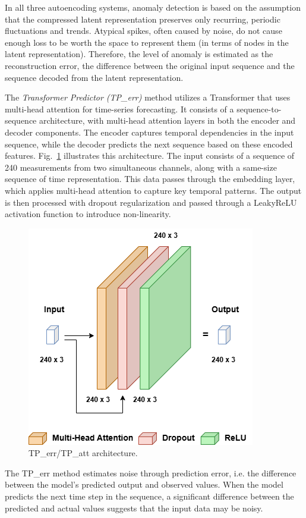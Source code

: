 \documentclass[runningheads]{llncs}
\begin{document}
In all three autoencoding systems, anomaly detection is based on the
assumption that the compressed latent representation preserves only
recurring, periodic fluctuations and trends. Atypical spikes, often
caused by noise, do not cause enough loss to be worth the space to
represent them (in terms of nodes in the latent representation).
Therefore, the level of anomaly is estimated as the reconstruction
error, the difference between the original input sequence and the
sequence decoded from the latent representation.

The \emph{Transformer Predictor (TP\_err)} method utilizes a
Transformer that uses multi-head attention for time-series
forecasting. It consists of a sequence-to-sequence architecture, with
multi-head attention layers in both the encoder and decoder
components. The encoder captures temporal dependencies in the input
sequence, while the decoder predicts the next sequence based on these
encoded features.
%
Fig.~\ref{fig:Fig3} illustrates this architecture. The input consists
of a sequence of 240 measurements from two simultaneous channels,
along with a same-size sequence of time representation. This data
passes through the embedding layer, which applies multi-head attention
to capture key temporal patterns. The output is then processed with
dropout regularization and passed through a LeakyReLU activation
function to introduce non-linearity.


\begin{figure}[tb]
\centering
\includegraphics[width=0.55\columnwidth]{images/Fig3.png}
\caption{\label{fig:Fig3} TP\_err/TP\_att architecture.}
\end{figure}

The TP\_err method estimates noise through prediction error, i.e. the
difference between the model's predicted output and observed
values. When the model predicts the next time step in the sequence, a
significant difference between the predicted and actual values
suggests that the input data may be noisy.
\end{document}
